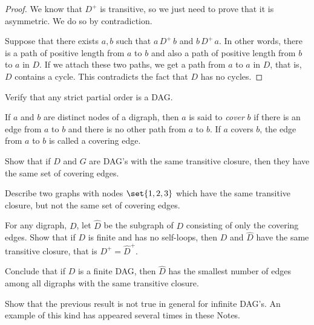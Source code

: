 \begin{proof}
We know that $D^+$ is transitive, so we just need to prove that it is
asymmetric.  We do so by contradiction.

Suppose that there exists $a,b$ such that $a\, D^+\, b$ and $b\, D^+\,
a$.  In other words, there is a path of positive length from $a$ to $b$
and also a path of positive length from $b$ to $a$ in $D$.  If we attach
these two paths, we get a path from $a$ to $a$ in $D$, that is, $D$
contains a cycle.  This contradicts the fact that $D$ has no cycles.
\end{proof}

\begin{problem}
Verify that any strict partial order is a DAG.

\end{problem}


\begin{problem}
If $a$ and $b$ are distinct nodes of a digraph, then $a$ is said to
\emph{cover} $b$ if there is an edge from $a$ to $b$ and there is no other
path from $a$ to $b$.  If $a$ covers $b$, the edge from $a$ to $b$ is
called a covering edge.

\bparts

\ppart Show that if $D$ and $G$ are DAG's with the same transitive
closure, then they have the same set of covering edges.

\ppart Describe two graphs with nodes $\set{1,2,3}$ which have the same
transitive closure, but not the same set of covering edges.


\ppart For any digraph, $D$, let $\widehat{D}$ be the subgraph of $D$
consisting of only the covering edges.  Show that if $D$ is finite and has
no self-loops, then $D$ and $\widehat{D}$ have the same transitive closure,
that is $D^+ = \widehat{D}^+$.
 
\ppart Conclude that if $D$ is a finite DAG, then $\widehat{D}$ has the
smallest number of edges among all digraphs with the same transitive
closure.

\ppart Show that the previous result is not true in general for infinite
DAG's. \hint An example of this kind has appeared several times in these
Notes.


\eparts
\end{problem}


